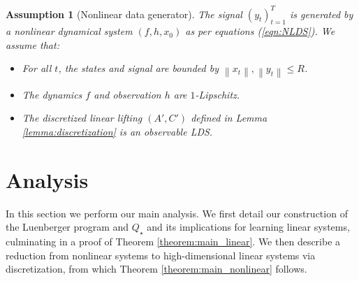 \documentclass[11pt]{article}
\newcommand{\evannote}[1]{\textcolor{red}{\{evan: #1\}}}
\newcommand{\norm}[1]{\left\lVert#1\right\rVert}
\def\Exp{\mathbb{\mathbb{E}}}
\def\Exp{\mathbb{\mathbb{E}}}
\newtheorem{assumption}[theorem]{Assumption}
\numberwithin{equation}{section}
\begin{document}

\begin{assumption}[Nonlinear data generator]
\label{assumption:nonlinear}
    The signal $(y_t)_{t=1}^T$ is generated by a nonlinear dynamical system $(f,h,x_0)$ as per equations (\ref{eqn:NLDS}). We assume that:
    \begin{itemize}
    \item[(i)] For all $t$, the states and signal are bounded by $\norm{x_t}, \norm{y_t} \leq R$.
    \item[(ii)] The dynamics $f$ and observation $h$ are $1$-Lipschitz.
    \item[(iii)] The discretized linear lifting $(A', C')$ defined in Lemma \ref{lemma:discretization} is an observable LDS.     %
    \end{itemize}
\end{assumption}





\section{Analysis}

In this section we perform our main analysis. We first detail our construction of the Luenberger program and $Q_\star$ and its implications for learning linear systems, culminating in a proof of Theorem \ref{theorem:main_linear}. We then describe a reduction from nonlinear systems to high-dimensional linear systems via discretization, from which Theorem \ref{theorem:main_nonlinear} follows.
\end{document}
